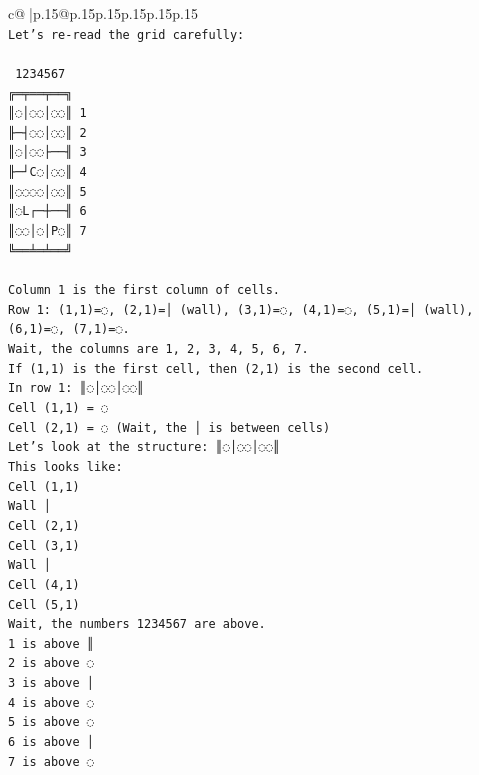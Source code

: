 \documentclass{article}
\begin{document}
{\begin{supertabular}{c@{$\;$}|p{.15\linewidth}@{}p{.15\linewidth}p{.15\linewidth}p{.15\linewidth}p{.15\linewidth}p{.15\linewidth}}
{{{\\ 
\texttt{Let's re{-}read the grid carefully:} \\
\\ 
\texttt{ 1234567} \\
\texttt{╔═╤══╤══╗} \\
\texttt{║◌│◌◌│◌◌║ 1} \\
\texttt{╟─┤◌◌│◌◌║ 2} \\
\texttt{║◌│◌◌├──╢ 3} \\
\texttt{╟─┘C◌│◌◌║ 4} \\
\texttt{║◌◌◌◌│◌◌║ 5} \\
\texttt{║◌L┌─┼──╢ 6} \\
\texttt{║◌◌│◌│P◌║ 7} \\
\texttt{╚══╧═╧══╝} \\
\\ 
\texttt{Column 1 is the first column of cells.} \\
\texttt{Row 1: (1,1)=◌, (2,1)=│ (wall), (3,1)=◌, (4,1)=◌, (5,1)=│ (wall), (6,1)=◌, (7,1)=◌.} \\
\texttt{Wait, the columns are 1, 2, 3, 4, 5, 6, 7.} \\
\texttt{If (1,1) is the first cell, then (2,1) is the second cell.} \\
\texttt{In row 1: ║◌│◌◌│◌◌║} \\
\texttt{Cell (1,1) = ◌} \\
\texttt{Cell (2,1) = ◌ (Wait, the │ is between cells)} \\
\texttt{Let's look at the structure: ║◌│◌◌│◌◌║} \\
\texttt{This looks like:} \\
\texttt{Cell (1,1)} \\
\texttt{Wall │} \\
\texttt{Cell (2,1)} \\
\texttt{Cell (3,1)} \\
\texttt{Wall │} \\
\texttt{Cell (4,1)} \\
\texttt{Cell (5,1)} \\
\texttt{Wait, the numbers 1234567 are above.} \\
\texttt{1 is above ║} \\
\texttt{2 is above ◌} \\
\texttt{3 is above │} \\
\texttt{4 is above ◌} \\
\texttt{5 is above ◌} \\
\texttt{6 is above │} \\
\texttt{7 is above ◌} \\
}}}
\end{supertabular}}
\end{document}
